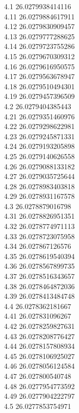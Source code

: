 {4.1	26.0279938414116\\
4.11	26.0279884617911\\
4.12	26.0279830909457\\
4.13	26.0279777288625\\
4.14	26.0279723755286\\
4.15	26.0279670309312\\
4.16	26.0279616950575\\
4.17	26.0279563678947\\
4.18	26.0279510494301\\
4.19	26.0279457396509\\
4.2	26.0279404385443\\
4.21	26.0279351460976\\
4.22	26.0279298622981\\
4.23	26.0279245871331\\
4.24	26.0279193205898\\
4.25	26.0279140626558\\
4.26	26.0279088133182\\
4.27	26.0279035725644\\
4.28	26.0278983403818\\
4.29	26.0278931167578\\
4.3	26.0278879016798\\
4.31	26.0278826951351\\
4.32	26.0278774971113\\
4.33	26.0278723075958\\
4.34	26.027867126576\\
4.35	26.0278619540394\\
4.36	26.0278567899735\\
4.37	26.0278516343657\\
4.38	26.0278464872036\\
4.39	26.0278413484748\\
4.4	26.0278362181667\\
4.41	26.027831096267\\
4.42	26.0278259827631\\
4.43	26.0278208776427\\
4.44	26.0278157808934\\
4.45	26.0278106925027\\
4.46	26.0278056124584\\
4.47	26.027800540748\\
4.48	26.0277954773592\\
4.49	26.0277904222797\\
4.5	26.0277853754971\\
}
